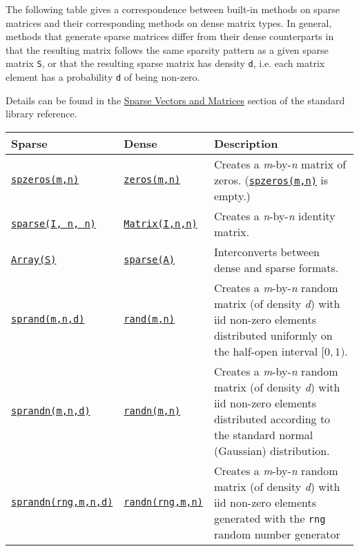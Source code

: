 The following table gives a correspondence between built-in methods on sparse matrices and their corresponding methods on dense matrix types. In general, methods that generate sparse matrices differ from their dense counterparts in that the resulting matrix follows the same sparsity pattern as a given sparse matrix \texttt{S}, or that the resulting sparse matrix has density \texttt{d}, i.e. each matrix element has a probability \texttt{d} of being non-zero.



Details can be found in the \hyperlink{2592358466672034664}{Sparse Vectors and Matrices} section of the standard library reference.




\begin{table}[h]

\begin{tabulary}{\linewidth}{|L|L|L|}
\hline
Sparse & Dense & Description \\
\hline
\hyperlink{10306793690101482847}{\texttt{spzeros(m,n)}} & \hyperlink{13837674686090348619}{\texttt{zeros(m,n)}} & Creates a \emph{m}-by-\emph{n} matrix of zeros. (\hyperlink{10306793690101482847}{\texttt{spzeros(m,n)}} is empty.) \\
\hline
\hyperlink{10167157011990389788}{\texttt{sparse(I, n, n)}} & \hyperlink{5448927444601277512}{\texttt{Matrix(I,n,n)}} & Creates a \emph{n}-by-\emph{n} identity matrix. \\
\hline
\hyperlink{15492651498431872487}{\texttt{Array(S)}} & \hyperlink{10167157011990389788}{\texttt{sparse(A)}} & Interconverts between dense and sparse formats. \\
\hline
\hyperlink{10437881912081266792}{\texttt{sprand(m,n,d)}} & \hyperlink{7668863842145012694}{\texttt{rand(m,n)}} & Creates a \emph{m}-by-\emph{n} random matrix (of density \emph{d}) with iid non-zero elements distributed uniformly on the half-open interval \([0, 1)\). \\
\hline
\hyperlink{3588082437273281277}{\texttt{sprandn(m,n,d)}} & \hyperlink{7347069443766288058}{\texttt{randn(m,n)}} & Creates a \emph{m}-by-\emph{n} random matrix (of density \emph{d}) with iid non-zero elements distributed according to the standard normal (Gaussian) distribution. \\
\hline
\hyperlink{3588082437273281277}{\texttt{sprandn(rng,m,n,d)}} & \hyperlink{7347069443766288058}{\texttt{randn(rng,m,n)}} & Creates a \emph{m}-by-\emph{n} random matrix (of density \emph{d}) with iid non-zero elements generated with the \texttt{rng} random number generator \\
\hline
\end{tabulary}

\end{table}




